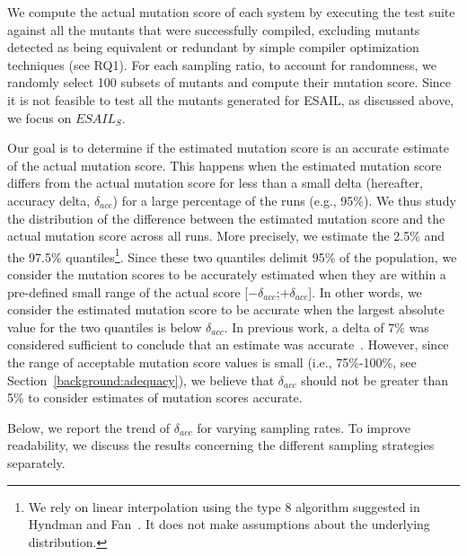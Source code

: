 We compute the actual mutation score of each system by executing the test suite against all the mutants that were successfully compiled, excluding mutants detected as being equivalent or redundant by simple compiler optimization techniques (see RQ1). 
For each sampling ratio, to account for randomness, we randomly select 100 subsets of mutants and compute their mutation score. 
Since it is not feasible to test all the mutants generated for ESAIL, as discussed above, we focus on $\mathit{ESAIL}_{S}$.



%

%
Our goal is to determine if the estimated mutation score is an accurate estimate of the actual mutation score.
This happens when the estimated mutation score differs from the actual mutation score for less than a small delta (hereafter, accuracy delta, $\delta_{acc}$) for a large percentage of the runs (e.g., 95\%).
We thus study the distribution of the difference between the estimated mutation score and the actual mutation score across all runs. More precisely, we estimate the 2.5\% and the 97.5\% quantiles\footnote{We rely on linear interpolation using the type 8 
algorithm suggested in Hyndman and Fan~\cite{Hyndman1996}. It does not make assumptions about the underlying distribution.}.
Since these two quantiles delimit 95\% of the population,
we consider the mutation scores to be accurately estimated when they are within a pre-defined small range of the actual score [$-\delta_{acc}$;$+\delta_{acc}$].
In other words, we consider the estimated mutation score to be accurate when 
the largest absolute value for the two quantiles is below $\delta_{acc}$.
In previous work, a delta of $7\%$ was considered sufficient to conclude that an estimate was accurate~\cite{gopinath2015hard}.
However, since the range of acceptable mutation score values is small (i.e., 75\%-100\%, see Section~\ref{background:adequacy}), we believe that $\delta_{acc}$ should not be greater than 5\% to consider estimates of mutation scores accurate. 

Below, we report the trend of $\delta_{acc}$ for varying sampling rates. To improve readability, we discuss the results concerning the different sampling strategies separately.

